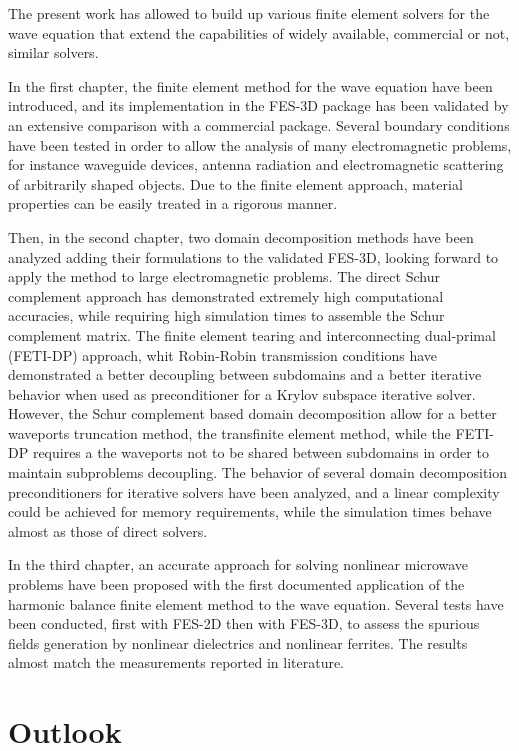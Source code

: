 The present work has allowed to build up various finite element solvers for the wave equation that extend the capabilities of widely available, commercial or not, similar solvers.

In the first chapter, the finite element method for the wave equation have been introduced, and its implementation in the FES-3D package has been validated by an extensive comparison with a commercial package. Several boundary conditions have been tested in order to allow the analysis of many electromagnetic problems, for instance waveguide devices, antenna radiation and electromagnetic scattering of arbitrarily shaped objects. Due to the finite element approach, material properties can be easily treated in a rigorous manner.

Then, in the second chapter, two domain decomposition methods have been analyzed adding their formulations to the validated FES-3D, looking forward to apply the method to large electromagnetic problems. The direct Schur complement approach has demonstrated extremely high computational accuracies, while requiring high simulation times to assemble the Schur complement matrix. The finite element tearing and interconnecting dual-primal (FETI-DP) approach, whit Robin-Robin transmission conditions have demonstrated a better decoupling between subdomains and a better iterative behavior when used as preconditioner for a Krylov subspace iterative solver. However, the Schur complement based domain decomposition allow for a better waveports truncation method, the transfinite element method, while the FETI-DP requires a the waveports not to be shared between subdomains in order to maintain subproblems decoupling. The behavior of several domain decomposition preconditioners for iterative solvers have been analyzed, and a linear complexity could be achieved for memory requirements, while the simulation times behave almost as those of direct solvers.

In the third chapter, an accurate approach for solving nonlinear microwave problems have been proposed with the first documented application of the harmonic balance finite element method to the wave equation. Several tests have been conducted, first with FES-2D then with FES-3D, to assess the spurious fields generation by nonlinear dielectrics and nonlinear ferrites. The results almost match the measurements reported in literature.

\section{Outlook}

